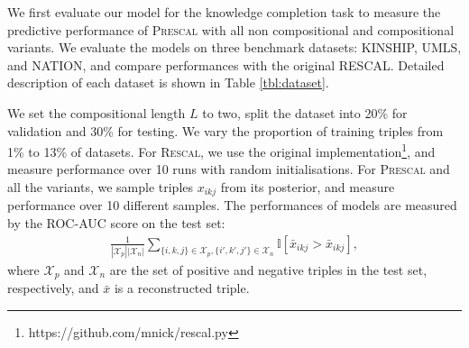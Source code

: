 

We first evaluate our model for the knowledge completion task
to measure the predictive performance of \textsc{Prescal} with all non compositional and compositional variants.
We evaluate the models on three benchmark datasets: KINSHIP, UMLS, and NATION, and compare  performances with the original \textsc{RESCAL}.
Detailed description of each
dataset is shown in Table \ref{tbl:dataset}.

We set the compositional length $L$ to two, split the dataset into 20\% for validation and 30\% for testing. We vary the proportion of training triples
from 1\% to 13\% of datasets. For \textsc{Rescal}, we use the original implementation\footnote{https://github.com/mnick/rescal.py}, and measure performance over 10 runs with random initialisations. For \textsc{Prescal} and all the variants, we sample triples $x_{ikj}$ from its posterior, and measure performance over 10 different samples.
The performances of models are measured by the ROC-AUC score on the test set:
\begin{align}
\frac{1}{|\mathcal{X}_p|  |\mathcal{X}_n|} \sum_{\{i,k,j\} \in \mathcal{X}_p, \{i',k',j'\} \in \mathcal{X}_n} \mathbb{I}[\bar{x}_{ikj} > \bar{x}_{ikj}],
\end{align}
where $\mathcal{X}_p$ and $\mathcal{X}_n$ are the set of positive and negative triples in the test set, respectively, and $\bar{x}$ is a reconstructed triple.

